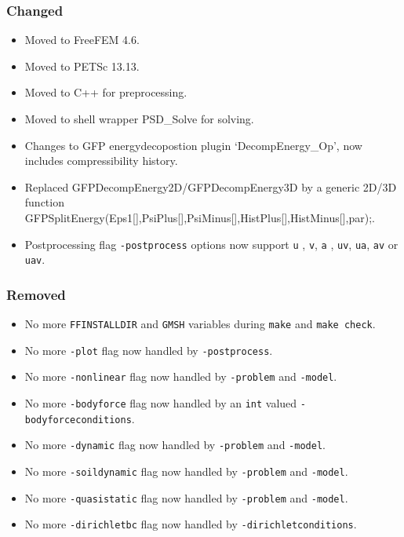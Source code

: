 \subsubsection{Changed}\label{changed-3}

\begin{itemize}
\tightlist
\item
  Moved to FreeFEM 4.6.
\item
  Moved to PETSc 13.13.
\item
  Moved to C++ for preprocessing.
\item
  Moved to shell wrapper PSD\_Solve for solving.
\item
  Changes to GFP energydecopostion plugin `DecompEnergy\_Op', now
  includes compressibility history.
\item
  Replaced GFPDecompEnergy2D/GFPDecompEnergy3D by a generic 2D/3D
  function
  GFPSplitEnergy(Eps1{[}{]},PsiPlus{[}{]},PsiMinus{[}{]},HistPlus{[}{]},HistMinus{[}{]},par);.
\item
  Postprocessing flag \lstinline!-postprocess! options now support
  \lstinline!u! , \lstinline!v!, \lstinline!a! , \lstinline!uv!,
  \lstinline!ua!, \lstinline!av! or \lstinline!uav!.
\end{itemize}

\subsubsection{Removed}\label{removed-1}

\begin{itemize}
\tightlist
\item
  No more \lstinline!FFINSTALLDIR! and \lstinline!GMSH! variables during
  \lstinline!make! and \lstinline!make check!.
\item
  No more \lstinline!-plot! flag now handled by
  \lstinline!-postprocess!.
\item
  No more \lstinline!-nonlinear! flag now handled by
  \lstinline!-problem! and \lstinline!-model!.
\item
  No more \lstinline!-bodyforce! flag now handled by an \lstinline!int!
  valued \lstinline!-bodyforceconditions!.
\item
  No more \lstinline!-dynamic! flag now handled by \lstinline!-problem!
  and \lstinline!-model!.
\item
  No more \lstinline!-soildynamic! flag now handled by
  \lstinline!-problem! and \lstinline!-model!.
\item
  No more \lstinline!-quasistatic! flag now handled by
  \lstinline!-problem! and \lstinline!-model!.
\item
  No more \lstinline!-dirichletbc! flag now handled by
  \lstinline!-dirichletconditions!.
\end{itemize}


